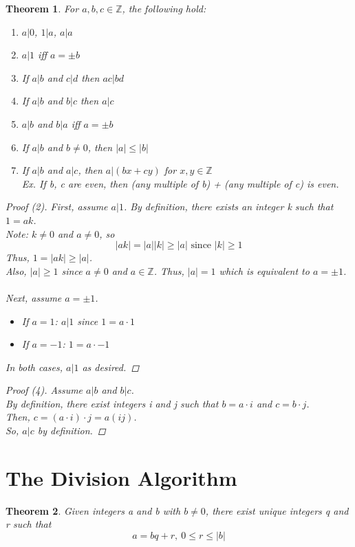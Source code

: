 \documentclass[letterpaper]{article}
\newtheorem{theorem}{Theorem}[section]
\begin{document}
    \begin{theorem}
        For $a,b,c\in\mathbb{Z}$, the following hold:
        \begin{enumerate}
            \item $a|0$, $1|a$, $a|a$
            \item $a|1$ iff $a=\pm b$
            \item If $a|b$ and $c|d$ then $ac|bd$
            \item If $a|b$ and $b|c$ then $a|c$
            \item $a|b$ and $b|a$ iff $a=\pm b$
            \item If $a|b$ and $b\neq 0$, then $|a|\leq |b|$
            \item If $a|b$ and $a|c$, then $a|(bx+cy)$ for $x,y\in\mathbb{Z}$ \\
                Ex. If b, c are even, then (any multiple of b) +
                (any multiple of c) is even.
        \end{enumerate}

        \begin{proof} [Proof (2)]
            First, assume $a|1$. By definition, there exists an integer k 
            such that $1=ak$. \\ Note: $k\neq 0$ and $a\neq 0$, so
            \[ |ak|=|a||k| \geq |a| \text{ since } |k| \geq 1 \]
            Thus, $1=|ak|\geq |a|$. \\
            Also, $|a|\geq 1$ since $a\neq 0$ and $a\in\mathbb{Z}$.
            Thus, $|a|=1$ which is equivalent to $a=\pm 1$. \\\\
            Next, assume $a=\pm 1$.
            \begin{itemize}
                \item If $a=1$: $a|1$ since $1=a\cdot 1$
                \item If $a=-1$: $1=a\cdot -1$
            \end{itemize}
            In both cases, $a|1$ as desired.
        \end{proof}

        \begin{proof} [Proof (4)]
            Assume $a|b$ and $b|c$. \\
            By definition, there exist integers i and j such that 
            $b=a\cdot i$ and $c=b\cdot j$. \\
            Then, $c=(a\cdot i)\cdot j=a(ij)$. \\
            So, $a|c$ by definition.
        \end{proof}
    \end{theorem}

\section{The Division Algorithm}
    \begin{theorem}
        Given integers a and b with $b\neq 0$, there exist unique integers q and r such that
        \[ a=bq+r,\ 0\leq r\leq |b| \]
    \end{theorem}
\end{document}
